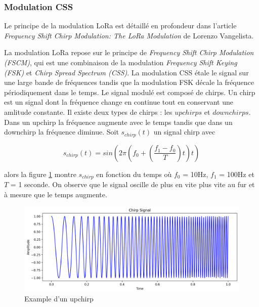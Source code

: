 \subsubsection{Modulation CSS}\label{css}

Le principe de la modulation LoRa est détaillé en profondeur dans l'article \textit{Frequency Shift Chirp Modulation: The LoRa Modulation}\cite{loraCSS} de Lorenzo Vangelista.

\vspace{0.1cm}

La modulation LoRa repose sur le principe de \textit{Frequency Shift Chirp Modulation (FSCM)}, qui est une combinaison de la modulation \textit{Frequency Shift Keying (FSK)} et \textit{Chirp Spread Spectrum (CSS)}.
La modulation CSS étale le signal sur une large bande de fréquences tandis que la modulation FSK décale la fréquence périodiquement dans le temps. Le signal modulé est composé de chirps. Un chirp est un signal dont la fréquence change en continue tout en conservant une amlitude constante. Il existe deux types de chirps : les $upchirps$ et $downchirps$.
Dans un upchirp la fréquence augmente avec le temps tandis que dans un downchirp la fréquence diminue. Soit $s_{chirp}(t)$ un signal chirp avec

\begin{equation}\label{eq3}
s_{chirp}(t) = sin(2\pi(f_0 + (\frac{f_1 - f_0}{T})t)t)
\end{equation}

alors la figure \ref{term5} montre $s_{chirp}$ en fonction du temps où $f_0$ = 10Hz, $f_1$ = 100Hz et $T$ = 1 seconde. On observe que le signal oscille de plus en vite plus vite au fur et à mesure que le temps augmente.

\begin{figure}[h]
\centering

\includegraphics[scale=0.18]{images/CSSupchirp.png}
\caption{Example d'un upchirp}\label{term5}
\end{figure}

